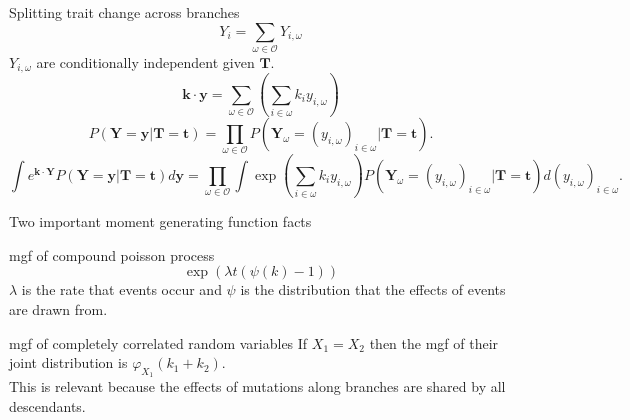 \documentclass{beamer}
\begin{document}
\begin{frame}{Splitting trait change across branches}
  \begin{equation*}
    Y_i = \sum_{\omega \in \mathcal{O}} Y_{i,\omega}
  \end{equation*}
  $Y_{i,\omega}$ are conditionally independent given $\mathbf{T}$. 
  \begin{equation*}
    \mathbf{k} \cdot \mathbf{y} = \sum_{\omega \in \mathcal{O}}\left( \sum_{i \in \omega} k_iy_{i,\omega}\right)
  \end{equation*}
  \begin{equation*}
    P(\mathbf{Y}=\mathbf{y}|\mathbf{T}=\mathbf{t}) = \prod_{\omega \in \mathcal{O}}
    P(\mathbf{Y}_{\omega}=(y_{i,\omega})_{i \in \omega} | \mathbf{T}=\mathbf{t}).
  \end{equation*}
  \footnotesize
  \begin{equation*} \label{eq:factor}
    \int e^{\mathbf{k} \cdot \mathbf{Y}} P(\mathbf{Y}=\mathbf{y} |\mathbf{T}=\mathbf{t}) d\mathbf{y} =
    \prod_{\omega \in \mathcal{O}}\int \exp\left(\sum_{i \in \omega}k_iy_{i,\omega}\right)
    P(\mathbf{Y}_{\omega}=(y_{i,\omega})_{i \in \omega} | \mathbf{T}=\mathbf{t})d(y_{i,\omega})_{i \in \omega}.
  \end{equation*}
  \normalsize
\end{frame}

\begin{frame}{Two important moment generating function facts}
  \begin{block}{mgf of compound poisson process}
    \begin{equation*}
      \exp\left(\lambda t (\psi(k)-1)\right)
    \end{equation*}
    $\lambda$ is the rate that events occur and $\psi$ is the distribution that
    the effects of events are drawn from. 
  \end{block}
  \begin{block}{mgf of completely correlated random variables}
    If $X_1=X_2$ then the mgf of their joint distribution is
    $\varphi_{X_1}(k_1+k_2)$.\\
    This is relevant because the effects of mutations along branches are shared
    by all descendants.
  \end{block}
\end{frame}
\end{document}
